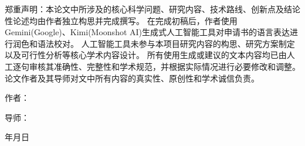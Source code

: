 \begin{ai}
郑重声明：本论文中所涉及的核心科学问题、研究内容、技术路线、创新点及结论性论述均由作者独立构思并完成撰写。
在完成初稿后，作者使用Gemini(Google)、Kimi(Moonshot AI)生成式人工智能工具对申请书的语言表达进行润色和语法校对。
人工智能工具未参与本项目研究内容的构思、研究方案制定以及可行性分析等核心学术内容设计。
所有使用生成或建议的文本内容均已由人工逐句审核其准确性、完整性和学术规范，并根据实际情况进行必要修改和调整。
论文作者及其导师对文中所有内容的真实性、原创性和学术诚信负责。

\vspace{5em}
\begin{flushright}
作者：\underline{\makebox[80pt]{}}

\vspace{2em}
导师：\underline{\makebox[80pt]{}}

\vspace{2em}
年\hspace{21pt}月\hspace{21pt}日
\end{flushright}


\end{ai}
